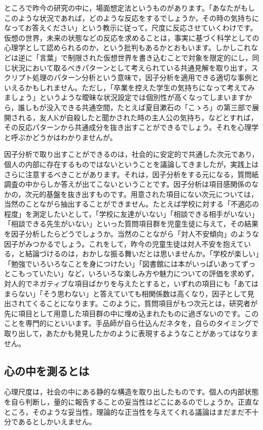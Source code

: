 \documentclass{ltjsbook}
\begin{document}
ところで昨今の研究の中に，場面想定法というものがあります。「あなたがもしこのような状況であれば，どのような反応をするでしょうか，その時の気持ちになってお答えください」という教示に従って，尺度に反応させていくわけです。仮想の世界，未来の状態などの反応を求めることは，事実に基づく科学としての心理学として認められるのか，という批判もあるかとおもいます。しかしこれなどは逆に「言葉」で制限された仮想世界を書き込むことで対象を限定的にし，同じ状況において取るべきパターンとして考えられている共通見解を取り出す，スクリプト処理のパターン分析という意味で，因子分析を適用できる適切な事例といえるかもしれません。ただし，「卒業を控えた学生の気持ちになって考えてみましょう」というような曖昧な状況設定では個別性が高くなってしまいますから，誰しもが没入できる共通空間，たとえば夏目漱石の「こゝろ」の第三部で展開される，友人Kが自殺したと聞かされた時の主人公の気持ち，などとすれば，その反応パターンから共通成分を抜き出すことができるでしょう。それを心理学と呼ぶかどうかはわかりませんが。

因子分析で取り出すことができるのは，社会的に安定的で共通した次元であり，個人の内部に存在するものではないということを議論してきましたが，実践上はさらに注意するべきことがあります。それは，因子分析をする元になる，質問紙調査の中からしか答えが出てこないということです。因子分析は項目感関係のなかの，次元的基盤を抜き出すものです。用意された項目にない次元については，当然のことながら抽出することができません。たとえば学校に対する「不適応の程度」を測定したいとして，「学校に友達がいない」「相談できる相手がいない」「相談できる先生がいない」といった質問項目群を児童生徒に与えて，その結果を因子分析したらどうでしょうか。当然のことながら「対人不安傾向」のような因子がみつかるでしょう。これをして，昨今の児童生徒は対人不安を抱えている，と結論づけるのは，おかしな振る舞いだとは思いませんか。「学校が楽しい」「勉強でいろいろなことを身につけたい」「図書館には本がいっぱいあってずっとこもっていたい」など，いろいろな楽しみ方や魅力についての評価を求めず，対人的でネガティブな項目ばかりを与えたとすると，いずれの項目にも「あてはまらない」「そう思わない」と答えていても相関係数は高くなり，因子として見出されてくることになります。このように，質問項目がもつ次元とは，研究者が先に項目として用意した項目群の中に埋め込まれたものに過ぎないのです。このことを専門的にといいます。手品師が自ら仕込んだネタを，自らのタイミングで取り出して，あたかも発見したかのように表現するようなことがあってはなりません。

\subsection{心の中を測るとは}
心理尺度は，社会の中にある静的な構造を取り出したものです。個人の内部状態を自ら判断し，量的に報告することの妥当性はどこにあるのでしょうか。正直なところ，そのような妥当性，理論的な正当性を与えてくれる議論はまだまだ不十分であるとしかいえません。
\end{document}
